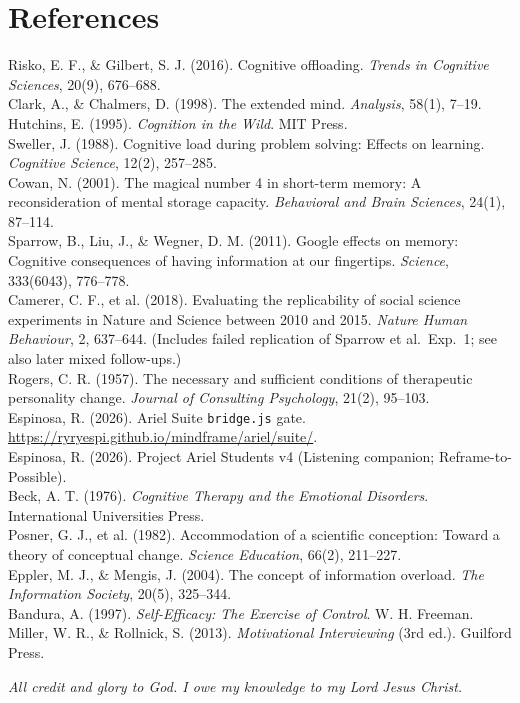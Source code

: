 \documentclass[11pt, a4paper]{article}
\begin{document}
\section*{References}
\noindent [1] Risko, E. F., \& Gilbert, S. J. (2016). Cognitive offloading. \textit{Trends in Cognitive Sciences}, 20(9), 676--688.\\
\noindent [2] Clark, A., \& Chalmers, D. (1998). The extended mind. \textit{Analysis}, 58(1), 7--19.\\
\noindent [3] Hutchins, E. (1995). \textit{Cognition in the Wild}. MIT Press.\\
\noindent [4] Sweller, J. (1988). Cognitive load during problem solving: Effects on learning. \textit{Cognitive Science}, 12(2), 257--285.\\
\noindent [5] Cowan, N. (2001). The magical number 4 in short-term memory: A reconsideration of mental storage capacity. \textit{Behavioral and Brain Sciences}, 24(1), 87--114.\\
\noindent [6] Sparrow, B., Liu, J., \& Wegner, D. M. (2011). Google effects on memory: Cognitive consequences of having information at our fingertips. \textit{Science}, 333(6043), 776--778.\\
\noindent [7] Camerer, C. F., et al. (2018). Evaluating the replicability of social science experiments in Nature and Science between 2010 and 2015. \textit{Nature Human Behaviour}, 2, 637--644. (Includes failed replication of Sparrow et al.\ Exp.~1; see also later mixed follow-ups.)\\
\noindent [8] Rogers, C. R. (1957). The necessary and sufficient conditions of therapeutic personality change. \textit{Journal of Consulting Psychology}, 21(2), 95--103.\\
\noindent [9] Espinosa, R. (2026). Ariel Suite \texttt{bridge.js} gate. \url{https://ryryespi.github.io/mindframe/ariel/suite/}.\\
\noindent [10] Espinosa, R. (2026). Project Ariel Students v4 (Listening companion; Reframe-to-Possible).\\
\noindent [11] Beck, A. T. (1976). \textit{Cognitive Therapy and the Emotional Disorders}. International Universities Press.\\
\noindent [12] Posner, G. J., et al. (1982). Accommodation of a scientific conception: Toward a theory of conceptual change. \textit{Science Education}, 66(2), 211--227.\\
\noindent [13] Eppler, M. J., \& Mengis, J. (2004). The concept of information overload. \textit{The Information Society}, 20(5), 325--344.\\
\noindent [14] Bandura, A. (1997). \textit{Self-Efficacy: The Exercise of Control}. W. H. Freeman.\\
\noindent [15] Miller, W. R., \& Rollnick, S. (2013). \textit{Motivational Interviewing} (3rd ed.). Guilford Press.

\vspace{1.1em}
\noindent\textit{All credit and glory to God. I owe my knowledge to my Lord Jesus Christ.}
\end{document}

